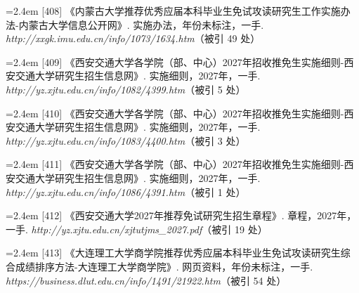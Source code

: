 {\vspace{3.5pt}\par
\nopagebreak\vspace{1pt}
\noindent\hangindent=2.4em \label{src:S0544}{\color{cAccent}[408]} 《内蒙古大学推荐优秀应届本科毕业生免试攻读研究生工作实施办法-内蒙古大学信息公开网》. 实施办法，年份未标注，一手. \textit{http://xxgk.imu.edu.cn/info/1073/1634.htm}（被引 49 处）\par
\vspace{0.6pt}
\vspace{3.5pt}\par
\nopagebreak\vspace{1pt}
\noindent\hangindent=2.4em \label{src:S0545}{\color{cAccent}[409]} 《西安交通大学各学院（部、中心）2027年招收推免生实施细则-西安交通大学研究生招生信息网》. 实施细则，2027年，一手. \textit{http://yz.xjtu.edu.cn/info/1082/4399.htm}（被引 5 处）\par
\vspace{0.6pt}
\noindent\hangindent=2.4em \label{src:S0546}{\color{cAccent}[410]} 《西安交通大学各学院（部、中心）2027年招收推免生实施细则-西安交通大学研究生招生信息网》. 实施细则，2027年，一手. \textit{http://yz.xjtu.edu.cn/info/1083/4400.htm}（被引 3 处）\par
\vspace{0.6pt}
\noindent\hangindent=2.4em \label{src:S0547}{\color{cAccent}[411]} 《西安交通大学各学院（部、中心）2027年招收推免生实施细则-西安交通大学研究生招生信息网》. 实施细则，2027年，一手. \textit{http://yz.xjtu.edu.cn/info/1086/4391.htm}（被引 1 处）\par
\vspace{0.6pt}
\noindent\hangindent=2.4em \label{src:S0548}{\color{cAccent}[412]} 《西安交通大学2027年推荐免试研究生招生章程》. 章程，2027年，一手. \textit{http://yz.xjtu.edu.cn/xjtutjms\_2027.pdf}（被引 19 处）\par
\vspace{0.6pt}
\vspace{3.5pt}\par
\nopagebreak\vspace{1pt}
\noindent\hangindent=2.4em \label{src:S0549}{\color{cAccent}[413]} 《大连理工大学商学院推荐优秀应届本科毕业生免试攻读研究生综合成绩排序方法-大连理工大学商学院》. 网页资料，年份未标注，一手. \textit{https://business.dlut.edu.cn/info/1491/21922.htm}（被引 54 处）\par
}
